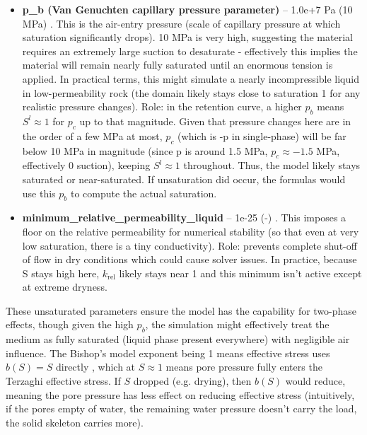 \documentclass[10pt,a4paper]{article}
\begin{document}
\begin{itemize}
\begin{itemize}
        \item \textbf{p\_b (Van Genuchten capillary pressure parameter)} – 1.0e+7 Pa (10 MPa) \cite{file:04_2_media_twophase}. This is the air-entry pressure (scale of capillary pressure at which saturation significantly drops). 10 MPa is very high, suggesting the material requires an extremely large suction to desaturate - effectively this implies the material will remain nearly fully saturated until an enormous tension is applied. In practical terms, this might simulate a nearly incompressible liquid in low-permeability rock (the domain likely stays close to saturation 1 for any realistic pressure changes). Role: in the retention curve, a higher $p_b$ means $S^l \approx 1$ for $p_c$ up to that magnitude. Given that pressure changes here are in the order of a few MPa at most, $p_c$ (which is -p in single-phase) will be far below 10 MPa in magnitude (since p is around 1.5 MPa, $p_c \approx -1.5$ MPa, effectively 0 suction), keeping $S^l \approx 1$ throughout. Thus, the model likely stays saturated or near-saturated. If unsaturation did occur, the formulas would use this $p_b$ to compute the actual saturation.
        \item \textbf{minimum\_relative\_permeability\_liquid} – 1e-25 (-) \cite{file:04_2_media_twophase}. This imposes a floor on the relative permeability for numerical stability (so that even at very low saturation, there is a tiny conductivity). Role: prevents complete shut-off of flow in dry conditions which could cause solver issues. In practice, because S stays high here, $k_{\text{rel}}$ likely stays near 1 and this minimum isn't active except at extreme dryness.
    \end{itemize}
\end{itemize}

These unsaturated parameters ensure the model has the capability for two-phase effects, though given the high $p_b$, the simulation might effectively treat the medium as fully saturated (liquid phase present everywhere) with negligible air influence. The Bishop's model exponent being 1 means effective stress uses $b(S)=S$ directly \cite{ogs:trm, doc:trm_gov_eq}, which at $S \approx 1$ means pore pressure fully enters the Terzaghi effective stress. If $S$ dropped (e.g. drying), then $b(S)$ would reduce, meaning the pore pressure has less effect on reducing effective stress (intuitively, if the pores empty of water, the remaining water pressure doesn't carry the load, the solid skeleton carries more).
\end{document}
